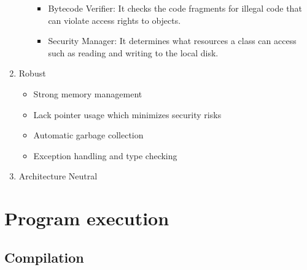 \documentclass{article}
\begin{document}
\begin{enumerate}
\begin{itemize}
\begin{itemize}
            \item Bytecode Verifier: It checks the code fragments for illegal code that can violate access rights to objects.
            \item Security Manager: It determines what resources a class can access such as reading and writing to the local disk. 
        \end{itemize}
    \end{itemize}
    \item Robust
    \begin{itemize}
        \item Strong memory management
        \item Lack pointer usage which minimizes security risks
        \item Automatic garbage collection
        \item Exception handling and type checking
    \end{itemize}
    \item  Architecture Neutral
\end{enumerate}

\section{Program execution}

\subsection{Compilation}
\end{document}
